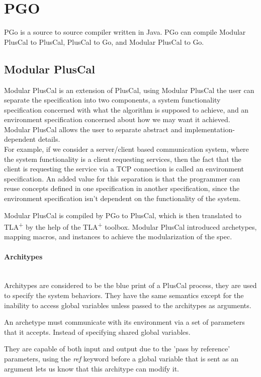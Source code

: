 \documentclass{thesul}
\newcommand{\tlaplus}{TLA\textsuperscript{+}\xspace}
\begin{document}
\section{PGO}

PGo is a source to source compiler written in Java. PGo can compile Modular PlusCal to PlusCal, PlusCal to Go, and Modular PlusCal to Go.

\subsection{Modular PlusCal}

Modular PlusCal is an extension of PlusCal, using Modular PlusCal the user can separate the specification into two components, a system functionality specification concerned with what the algorithm is supposed to achieve, and an environment specification concerned about how we may want it achieved. Modular PlusCal allows the user to separate abstract and implementation-dependent details.
\hfill\\

For example, if we consider a server/client based communication system, where the system functionality is a client requesting services, then the fact that the client is requesting the service via a TCP connection is called an environment specification. 
An added value for this separation is that the programmer can reuse concepts defined in one specification in another specification, since the environment specification isn't dependent on the functionality of the system.

Modular PlusCal is compiled by PGo to PlusCal, which is then translated to \tlaplus by the help of the \tlaplus toolbox. Modular PlusCal introduced archetypes, mapping macros, and instances to achieve the modularization of the spec.

\paragraph{\textbf{Architypes}}
\hfill\\
Architypes are considered to be the blue print of a PlusCal process, they are used to specify the system behaviors. They have the same semantics except for the inability to access global variables unless passed to the architypes as arguments.

An archetype must communicate with its environment via a set
of parameters that it accepts. Instead of specifying shared global variables.

They are capable of both input and output due to the 'pass by reference' parameters, using the \textit{ref} keyword before a global variable that is sent as an argument lets us know that this architype can modify it.
\end{document}
